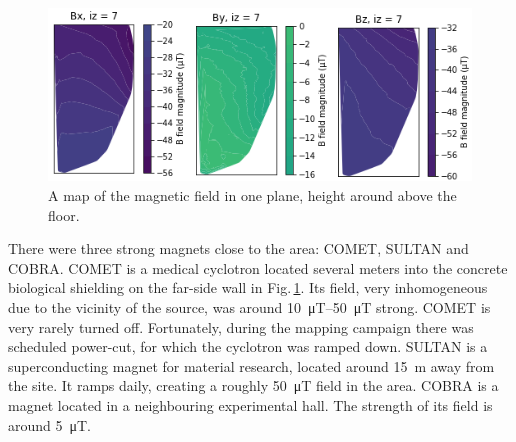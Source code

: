 
\begin{figure}
  \centering
  \includegraphics[width=\linewidth]{gfx/mapping/nSnCobCom.png}
  \caption{A map of the magnetic field in one plane, height around  above the floor. }\label{fig:mapping_photo}
\end{figure}

There were three strong magnets close to the area: COMET, SULTAN and COBRA\@. COMET is a medical cyclotron located several meters into the concrete biological shielding on the far-side wall in Fig.\,\ref{fig:mapping_photo}. Its field, very inhomogeneous due to the vicinity of the source, was around \SIrange[range-phrase=--,range-units=single]{10}{50}{\micro\tesla} strong. COMET is very rarely turned off. Fortunately, during the mapping campaign there was scheduled power-cut, for which the cyclotron was ramped down. SULTAN is a superconducting magnet for material research, located around \SI{15}{\metre} away from the site. It ramps daily, creating a roughly \SI{50}{\micro\tesla} field in the area. COBRA is a magnet located in a neighbouring experimental hall. The strength of its field is around \SI{5}{\micro\tesla}.


